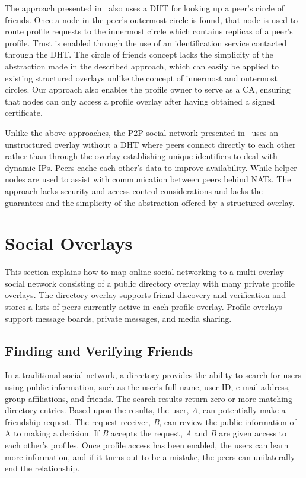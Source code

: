 The approach presented in~\cite{matryoshka} also uses a DHT for looking up a peer's
 circle of friends.  Once a node in the peer's
outermost circle is found, that node is used to route profile requests to the
innermost circle which contains replicas of a peer's profile. Trust is enabled
through the use of an identification service contacted through the DHT.  The
circle of friends concept lacks the simplicity of the abstraction made in the
described approach, which can easily be applied to existing structured overlays
unlike the concept of innermost and outermost circles.  Our approach
also enables the profile owner to serve as a CA, ensuring that nodes can only
access a profile overlay after having obtained a signed certificate.  

Unlike the above approaches, the P2P social network presented in~\cite{tribler-osn}
uses an unstructured overlay without a DHT where peers connect directly to
each other rather than through the overlay establishing unique identifiers to
deal with dynamic IPs.  Peers cache each other's data to improve availability.
While helper nodes are used to assist with communication between peers behind
NATs.  The approach lacks security and access control considerations and lacks the
guarantees and the simplicity of the abstraction offered by a structured overlay.

\section{Social Overlays}
\label{social_overlays}
This section explains how to map online social networking to a
multi-overlay social network consisting of a public directory overlay with many
private profile overlays.  The directory overlay supports friend discovery and
verification and stores a lists of peers currently active in each profile
overlay.  Profile overlays support message boards, private messages, and media
sharing.

\subsection{Finding and Verifying Friends}
In a traditional social network, a directory provides the ability to search
for users using public information, such as the user's full name, user ID,
e-mail address, group affiliations, and friends.  The search results return zero
or more matching directory entries.  Based upon the results, the user,
\textit{A}, can potentially make a friendship request.  The request receiver,
\textit{B}, can review the public information of A to making a decision.  If
\textit{B} accepts the request, \textit{A} and \textit{B} are given access to
each other's profiles.  Once profile access has been enabled, the users can
learn more information, and if it turns out to be a mistake, the peers can
unilaterally end the relationship.

